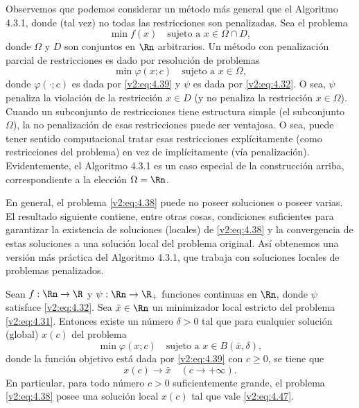 Observemos que podemos considerar un método más general que el Algoritmo 4.3.1, donde (tal vez) no todas las restricciones son penalizadas. Sea el problema
\[
    \min f(x) \quad \text{sujeto a } x \in \Omega \cap D,
\]
donde $\Omega$ y $D$ son conjuntos en $\Rn$ arbitrarios. Un método con penalización parcial de restricciones es dado por resolución de problemas
\[
    \min \varphi(x; c) \quad \text{sujeto a } x \in \Omega,
\]
donde $\varphi(\cdot; c)$ es dada por \eqref{v2:eq:4.39} y $\psi$ es dada por \eqref{v2:eq:4.32}. O sea, $\psi$ penaliza la violación de la restricción $x \in D$ (y no penaliza la restricción $x \in \Omega$). Cuando un subconjunto de restricciones tiene estructura simple (el subconjunto $\Omega$), la no penalización de esas restricciones puede ser ventajosa. O sea, puede tener sentido computacional tratar esas restricciones explícitamente (como restricciones del problema) en vez de implícitamente (vía penalización). Evidentemente, el Algoritmo 4.3.1 es un caso especial de la construcción arriba, correspondiente a la elección $\Omega = \Rn$.

En general, el problema \eqref{v2:eq:4.38} puede no poseer soluciones o poseer varias. El resultado siguiente contiene, entre otras cosas, condiciones suficientes para garantizar la existencia de soluciones (locales) de \eqref{v2:eq:4.38} y la convergencia de estas soluciones a una solución local del problema original. Así obtenemos una versión más práctica del Algoritmo 4.3.1, que trabaja con soluciones locales de problemas penalizados.

\begin{theorem}\label{v2:thm:4.3.2}
    Sean $f : \Rn \to \R$ y $\psi : \Rn \to \R_+$ funciones continuas en $\Rn$, donde $\psi$ satisface \eqref{v2:eq:4.32}. Sea $\bar{x} \in \Rn$ un minimizador local estricto del problema \eqref{v2:eq:4.31}.
    Entonces existe un número $\delta > 0$ tal que para cualquier solución (global) $x(c)$ del problema
    \begin{equation}
        \min \varphi(x; c) \quad \text{sujeto a } x \in B(\bar{x}, \delta),
        \label{v2:eq:4.46}
    \end{equation}
    donde la función objetivo está dada por \eqref{v2:eq:4.39} con $c \ge 0$, se tiene que
    \begin{equation}
        x(c) \to \bar{x} \quad (c \to +\infty).
        \label{v2:eq:4.47}
    \end{equation}
    En particular, para todo número $c > 0$ suficientemente grande, el problema \eqref{v2:eq:4.38} posee una solución local $x(c)$ tal que vale \eqref{v2:eq:4.47}.
\end{theorem}

